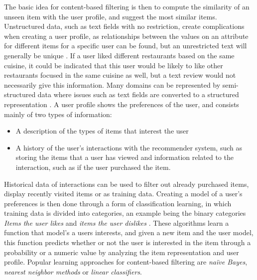 The basic idea for content-based filtering is then to compute the similarity of an unseen item with the user profile, and suggest the most similar items.
Unstructured data, such as text fields with no restriction, create complications when creating a user profile, as relationships between the values on an attribute for different items for a specific user can be found, but an unrestricted text will generally be unique \cite{ContentBasedFiltering}. 
If a user liked different restaurants based on the same cuisine, it could be indicated that this user would be likely to like other restaurants focused in the same cuisine as well, but a text review would not necessarily give this information.
Many domains can be represented by semi-structured data where issues such as text fields are converted to a structured representation \cite{ContentBasedFiltering}.
A user profile shows the preferences of the user, and consists mainly of two types of information:
\begin{itemize}
    \item A description of the types of items that interest the user
    \item A history of the user's interactions with the recommender system, such as storing the items that a user has viewed and information related to the interaction, such as if the user purchased the item.
\end{itemize}
Historical data of interactions can be used to filter out already purchased items, display recently visited items or as training data.
Creating a model of a user's preferences is then done through a form of classification learning, in which training data is divided into categories, an example being the binary categories \textit{Items the user likes} and \textit{items the user dislikes} \cite{ContentBasedFiltering}.
These algorithms learn a function that model's a users interests, and given a new item and the user model, this function predicts whether or not the user is interested in the item through a probability or a numeric value by analyzing the item representation and user profile.
Popular learning approaches for content-based filtering are \textit{naïve Bayes}, \textit{nearest neighbor methods} or \textit{linear classifiers}.

